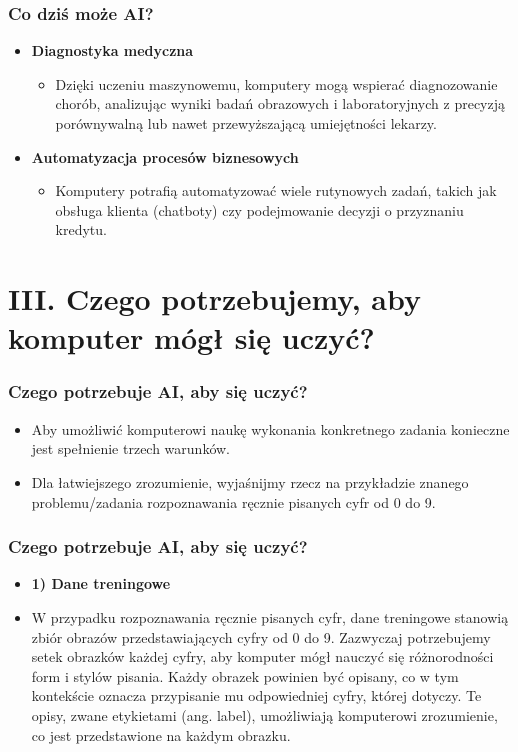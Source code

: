 \documentclass{beamer}
\begin{document}
\begin{frame}[fragile]
\frametitle{Co dziś może AI?}
\begin{itemize}
\item \textbf{Diagnostyka medyczna}
	\begin{itemize}
	\item Dzięki uczeniu maszynowemu, komputery mogą wspierać diagnozowanie chorób, analizując wyniki badań obrazowych i laboratoryjnych z precyzją porównywalną lub nawet przewyższającą umiejętności lekarzy.
	\end{itemize}
\item \textbf{Automatyzacja procesów biznesowych} 
	\begin{itemize}
	\item Komputery potrafią automatyzować wiele rutynowych zadań, takich jak obsługa klienta (chatboty) czy podejmowanie decyzji o przyznaniu kredytu.
	\end{itemize}
\end{itemize}

\end{frame}

\section{III. Czego potrzebujemy, aby komputer mógł się uczyć?}

\begin{frame}[fragile]
\frametitle{Czego potrzebuje AI, aby się uczyć?}
 \begin{itemize}
\item Aby umożliwić komputerowi naukę wykonania konkretnego zadania konieczne jest spełnienie trzech warunków.
\item Dla łatwiejszego zrozumienie, wyjaśnijmy rzecz na przykładzie znanego problemu/zadania rozpoznawania ręcznie pisanych cyfr od 0 do 9. 
\end{itemize}
\end{frame}

\begin{frame}[fragile]
\frametitle{Czego potrzebuje AI, aby się uczyć?}
\begin{itemize}
\item \textbf{1) Dane treningowe}
\item W przypadku rozpoznawania ręcznie pisanych cyfr, dane treningowe stanowią zbiór obrazów przedstawiających cyfry od 0 do 9. Zazwyczaj potrzebujemy setek obrazków każdej cyfry, aby komputer mógł nauczyć się różnorodności form i stylów pisania. Każdy obrazek powinien być opisany, co w tym kontekście oznacza przypisanie mu odpowiedniej cyfry, której dotyczy. Te opisy, zwane etykietami (ang. label), umożliwiają komputerowi zrozumienie, co jest przedstawione na każdym obrazku. 
\end{itemize}
\end{frame}
\end{document}
